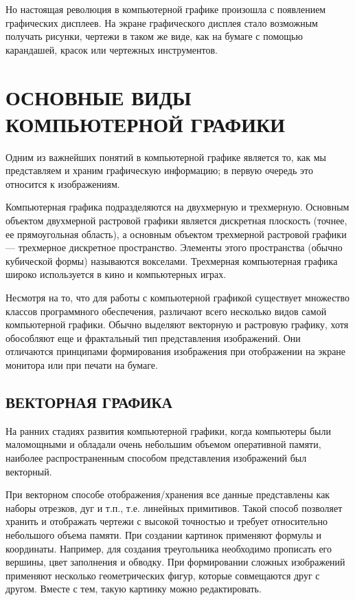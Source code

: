 \documentclass[referat]{SCWorks}
\begin{document}
Но настоящая революция в компьютерной графике произошла с появлением графических дисплеев. На экране графического дисплея стало возможным получать рисунки, чертежи в таком же виде, как на бумаге с помощью карандашей, красок или чертежных инструментов\cite{Vasiliev2005}.

\section{ОСНОВНЫЕ ВИДЫ КОМПЬЮТЕРНОЙ ГРАФИКИ}
Одним из важнейших понятий в компьютерной графике является то, как мы представляем и храним графическую информацию; в первую очередь это относится к изображениям. 

Компьютерная графика подразделяются на двухмерную и трехмерную. Основным объектом двухмерной растровой графики является дискретная плоскость (точнее, ее прямоугольная область), а основным объектом трехмерной растровой графики — трехмерное дискретное пространство. Элементы этого пространства (обычно кубической формы) называются вокселами\cite{Balykina2008}. Трехмерная компьютерная графика широко используется в кино и компьютерных играх.

Несмотря на то, что для работы с компьютерной графикой существует множество классов программного обеспечения, различают всего несколько видов самой компьютерной графики. Обычно выделяют векторную и растровую графику, хотя обособляют еще и фрактальный тип представления изображений. Они отличаются принципами формирования изображения при отображении на экране монитора или при печати на бумаге.

\subsection{ВЕКТОРНАЯ ГРАФИКА}
На ранних стадиях развития компьютерной графики, когда компьютеры были маломощными и обладали очень небольшим объемом оперативной памяти, наиболее распространенным способом представления изображений был векторный.

При векторном способе отображения/хранения все данные представлены как наборы отрезков, дуг и т.п., т.е. линейных примитивов. Такой способ позволяет хранить и отображать чертежи с высокой точностью и требует относительно небольшого объема памяти\cite{Boreskov2017}. При создании картинок применяют формулы и координаты. Например, для создания треугольника необходимо прописать его вершины, цвет заполнения и обводку. При формировании сложных изображений применяют несколько геометрических фигур, которые совмещаются друг с другом. Вместе с тем, такую картинку можно редактировать.
\end{document}
